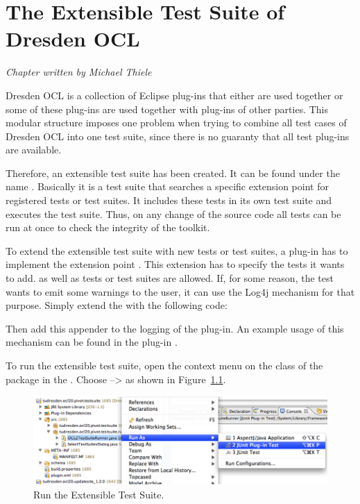 \chapter{The Extensible Test Suite of Dresden OCL}
\label{chapter:generalTestSuite}

\begin{flushright}
\textit{Chapter written by Michael Thiele}
\end{flushright}

Dresden OCL is a collection of Eclipse plug-ins that either are used together or
some of these plug-ins are used together with plug-ins of other parties. This 
modular structure imposes one problem when trying to combine all test cases of 
Dresden OCL into one test suite, since there is no guaranty that all test
plug-ins are available.

Therefore, an extensible test suite has been created. It can be found under the 
name . Basically it is a
test suite that searches a specific extension point for registered tests or test
suites. It includes these tests in its own test suite and executes the test
suite. Thus, on any change of the source code all tests can be run at once to 
check the integrity of the toolkit.

To extend the extensible test suite with new tests or test suites, a plug-in has
to implement the extension point . 
This extension has to specify the tests it wants to add.  as
well as  tests or test suites are allowed. If, for some reason,
the test wants to emit some warnings to the user, it can use the Log4j mechanism
for that purpose. Simply extend the  with the following
code:


Then add this appender to the logging of the plug-in. An example usage of this 
mechanism can be found in the plug-in 
.

To run the extensible test suite, open the context menu on the class 
 of the package 
 in the 
. Choose  --\textgreater {} as shown in Figure~\ref{pic:generalTestSuite:RunAs}.

\begin{figure}[!htbp]
	\centering
	\includegraphics[width=1.0\linewidth]{figures/generalTestSuite/RunAs}
	\caption{Run the Extensible Test Suite.}
	\label{pic:generalTestSuite:RunAs}
\end{figure}